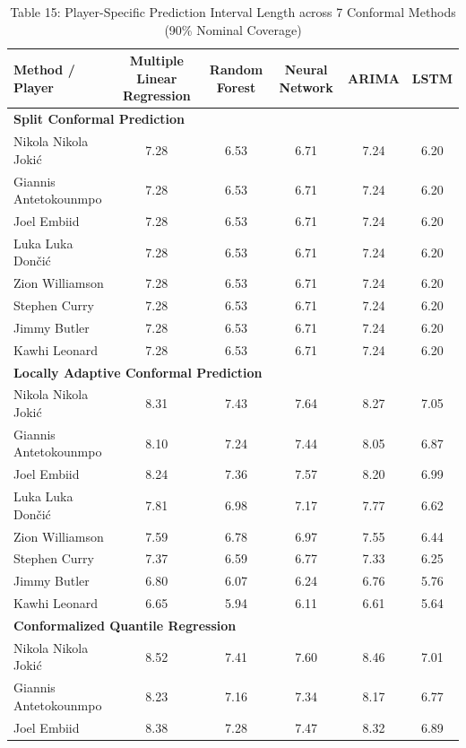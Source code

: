 \documentclass[11pt,a4paper]{article}
\begin{document}
\begin{table}[H]
\centering
\caption{Table 15: Player-Specific Prediction Interval Length across 7 Conformal Methods (90\% Nominal Coverage)}
\label{tab:star_len_90}
\scriptsize
\begin{tabular}{lccccc}
\toprule
Method / Player & Multiple Linear Regression & Random Forest & Neural Network & ARIMA & LSTM \\
\midrule
\multicolumn{6}{l}{\textbf{Split Conformal Prediction}} \\
\midrule
Nikola Nikola Joki\'{c} & 7.28 & 6.53 & 6.71 & 7.24 & 6.20 \\
Giannis Antetokounmpo & 7.28 & 6.53 & 6.71 & 7.24 & 6.20 \\
Joel Embiid & 7.28 & 6.53 & 6.71 & 7.24 & 6.20 \\
Luka Luka Don\v{c}i\'{c} & 7.28 & 6.53 & 6.71 & 7.24 & 6.20 \\
Zion Williamson & 7.28 & 6.53 & 6.71 & 7.24 & 6.20 \\
Stephen Curry & 7.28 & 6.53 & 6.71 & 7.24 & 6.20 \\
Jimmy Butler & 7.28 & 6.53 & 6.71 & 7.24 & 6.20 \\
Kawhi Leonard & 7.28 & 6.53 & 6.71 & 7.24 & 6.20 \\
\midrule
\multicolumn{6}{l}{\textbf{Locally Adaptive Conformal Prediction}} \\
\midrule
Nikola Nikola Joki\'{c} & 8.31 & 7.43 & 7.64 & 8.27 & 7.05 \\
Giannis Antetokounmpo & 8.10 & 7.24 & 7.44 & 8.05 & 6.87 \\
Joel Embiid & 8.24 & 7.36 & 7.57 & 8.20 & 6.99 \\
Luka Luka Don\v{c}i\'{c} & 7.81 & 6.98 & 7.17 & 7.77 & 6.62 \\
Zion Williamson & 7.59 & 6.78 & 6.97 & 7.55 & 6.44 \\
Stephen Curry & 7.37 & 6.59 & 6.77 & 7.33 & 6.25 \\
Jimmy Butler & 6.80 & 6.07 & 6.24 & 6.76 & 5.76 \\
Kawhi Leonard & 6.65 & 5.94 & 6.11 & 6.61 & 5.64 \\
\midrule
\multicolumn{6}{l}{\textbf{Conformalized Quantile Regression}} \\
\midrule
Nikola Nikola Joki\'{c} & 8.52 & 7.41 & 7.60 & 8.46 & 7.01 \\
Giannis Antetokounmpo & 8.23 & 7.16 & 7.34 & 8.17 & 6.77 \\
Joel Embiid & 8.38 & 7.28 & 7.47 & 8.32 & 6.89 \\

\end{tabular}
\end{table}
\end{document}
